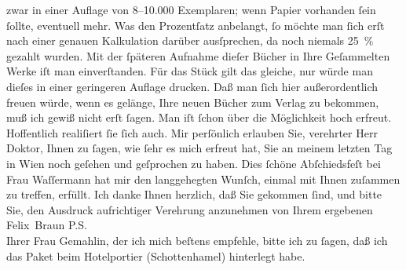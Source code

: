 \begin{ledgroupsized}[t]{13cm}
                    zwar in einer Auflage von 8–10.000 Exemplaren; wenn Papier vorhanden ſein
                    ſollte, eventuell mehr. Was den Prozentſatz anbelangt, ſo möchte man ſich erſt
                    nach einer genauen Kalkulation darüber ausſprechen, da noch niemals 25 {\%} gezahlt wurden. Mit der ſpäteren Aufnahme dieſer
                    Bücher in Ihre Geſammelten Werke iſt man
                    einverſtanden. Für das Stück
                    gilt das gleiche, nur würde man dieſes in einer geringeren Auflage drucken.\pend
           \pstart
           Daß man ſich hier außerordentlich freuen würde, wenn es gelänge, Ihre neuen
                    Bücher zum Verlag zu
                    bekommen, muß ich gewiß nicht erſt ſagen. Man iſt ſchon über die Möglichkeit
                    hoch erfreut. Hoffentlich realiſiert ſie ſich auch.\pend
           \pstart
           {\pb}Mir perſönlich erlauben Sie, verehrter Herr
                    Doktor, Ihnen zu ſagen, wie ſehr es mich erfreut hat, Sie an meinem letzten Tag
                    in Wien noch geſehen und geſprochen zu haben.
                    Dies ſchöne Abſchiedsfeſt bei Frau Waſſermann hat mir den langgehegten Wunſch, einmal mit Ihnen zuſammen
                    zu treffen, erfüllt. Ich danke Ihnen herzlich, daß Sie gekommen ſind, und bitte
                    Sie, den Ausdruck aufrichtiger Verehrung anzunehmen von Ihrem ergebenen\pend
           \pstart \spacefill\mbox{Felix Braun}\pend{}\pstart
           \noindent{}P.S.{\\}Ihrer Frau
                            Gemahlin, der ich mich beſtens empfehle, bitte ich zu ſagen, daß
                        ich das Paket beim Hotelportier (Schottenhamel) hinterlegt habe.\pend
           \endnumbering{}\end{ledgroupsized}  \newcommand{\dateiname}{L02285}\newcommand{\titel}{Felix Braun an Arthur Schnitzler, 21. 4. 1918}\newcommand{\editorInnen}{Martin Anton Müller und Gerd-Hermann Susen}
      